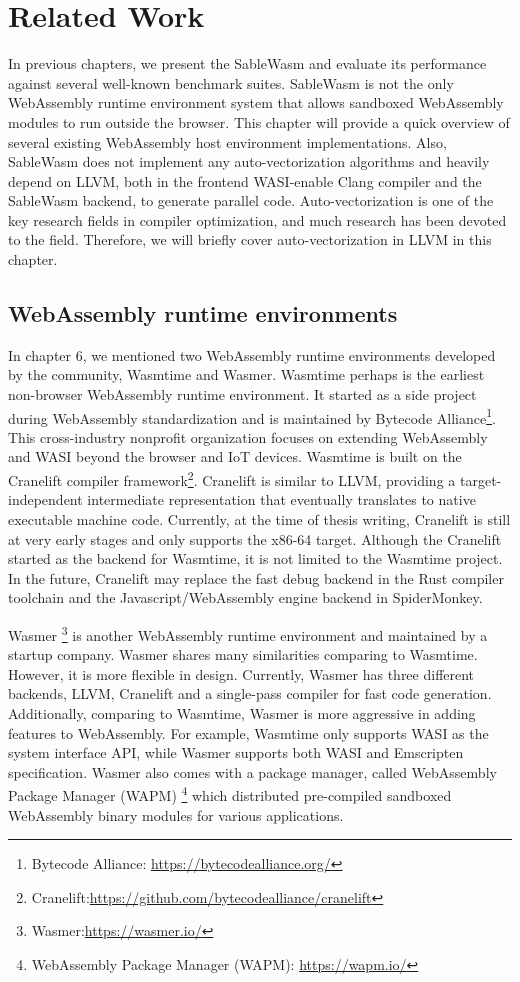 \chapter{Related Work}

In previous chapters, we present the SableWasm and evaluate its performance against several well-known benchmark suites. SableWasm is not the only WebAssembly runtime environment system that allows sandboxed WebAssembly modules to run outside the browser. This chapter will provide a quick overview of several existing WebAssembly host environment implementations. Also, SableWasm does not implement any auto-vectorization algorithms and heavily depend on LLVM, both in the frontend WASI-enable Clang compiler and the SableWasm backend, to generate parallel code. Auto-vectorization is one of the key research fields in compiler optimization, and much research has been devoted to the field. Therefore, we will briefly cover auto-vectorization in LLVM in this chapter.

\section*{WebAssembly runtime environments}

In chapter 6, we mentioned two WebAssembly runtime environments developed by the community, Wasmtime and Wasmer. Wasmtime perhaps is the earliest non-browser WebAssembly runtime environment. It started as a side project during WebAssembly standardization and is maintained by Bytecode Alliance\footnote{Bytecode Alliance: \url{https://bytecodealliance.org/}}. This cross-industry nonprofit organization focuses on extending WebAssembly and WASI beyond the browser and IoT devices. Wasmtime is built on the Cranelift compiler framework\footnote{Cranelift:\url{https://github.com/bytecodealliance/cranelift}}. Cranelift is similar to LLVM, providing a target-independent intermediate representation that eventually translates to native executable machine code. Currently, at the time of thesis writing, Cranelift is still at very early stages and only supports the x86-64 target. Although the Cranelift started as the backend for Wasmtime, it is not limited to the Wasmtime project. In the future, Cranelift may replace the fast debug backend in the Rust compiler toolchain and the Javascript/WebAssembly engine backend in SpiderMonkey.

Wasmer \footnote{Wasmer:\url{https://wasmer.io/}} is another WebAssembly runtime environment and maintained by a startup company. Wasmer shares many similarities comparing to Wasmtime. However, it is more flexible in design. Currently, Wasmer has three different backends, LLVM, Cranelift and a single-pass compiler for fast code generation. Additionally, comparing to Wasmtime, Wasmer is more aggressive in adding features to WebAssembly. For example, Wasmtime only supports WASI as the system interface API, while Wasmer supports both WASI and Emscripten specification. Wasmer also comes with a package manager, called WebAssembly Package Manager (WAPM) \footnote{WebAssembly Package Manager (WAPM): \url{https://wapm.io/}} which distributed pre-compiled sandboxed WebAssembly binary modules for various applications.

